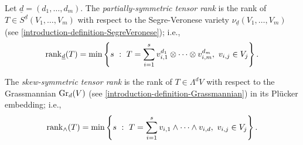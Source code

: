  \begin{definition}
 \label{geometrySecants-definition-partially_symmetric_tensor_rank}
     Let $\underline{d} = (d_1,\ldots,d_m)$. The \emph{partially-symmetric tensor rank} is the rank of $T \in S^{\underline{d}}(V_1,\ldots,V_m)$ with respect to the Segre-Veronese variety $\nu_{\underline{d}}(V_1,\ldots,V_m)$ (see \ref{introduction-definition-SegreVeronese}); i.e., 
     \[
         \mathrm{rank}_{\underline{d}}(T) = \min\left\{s ~:~ T = \sum_{i=1}^s v_{i,1}^{d_1}\otimes \cdots \otimes v_{i,m}^{d_m}, ~ v_{i,j} \in V_j\right\}.
     \]
 \end{definition}
 
 \begin{definition}
 \label{geometrySecants-definition-skewsymmetric_tensor_rank}
     The \emph{skew-symmetric tensor rank} is the rank of $T \in \Lambda^dV$ with respect to the Grassmannian $\mathrm{Gr}_d(V)$ (see \ref{introduction-definition-Grassmannian}) in its Pl\"ucker embedding; i.e., 
     \[
         \mathrm{rank}_{\wedge}(T) = \min\left\{s ~:~ T = \sum_{i=1}^s v_{i,1}\wedge \dots \wedge v_{i,d}, ~ v_{i,j} \in V_j\right\}.
     \]
 \end{definition}
 
 
 
